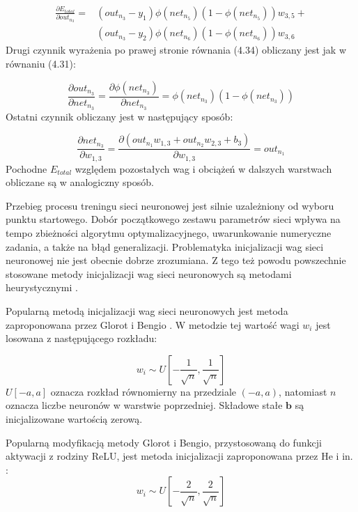 \documentclass[notitlepage]{report}
\begin{document}
\begin{equation}
\begin{split}
\frac{\partial E_{total}}{\partial out_{n_3}}  = & (out_{n_3} - y_1)\phi(net_{n_5})(1 - \phi(net_{n_5}))w_{3,5} + \\ & (out_{n_3} - y_2)\phi(net_{n_6})(1 - \phi(net_{n_6}))w_{3,6}
\end{split}
\end{equation}
Drugi czynnik wyrażenia po prawej stronie równania (4.34) obliczany jest jak w równaniu (4.31):

\begin{equation}
\frac{\partial out_{n_3}}{\partial net_{n_3}} = \frac{\partial \phi(net_{n_3})}{\partial net_{n_3}} = \phi (net_{n_3})(1 - \phi(net_{n_3}))
\end{equation}
Ostatni czynnik obliczany jest w następujący sposób:

\begin{equation}
\frac{\partial net_{n_3}}{\partial w_{1,3}} = \frac{\partial (out_{n_1}w_{1,3} + out_{n_2}w_{2,3} + b_3)}{\partial w_{1,3}} = out_{n_1}
\end{equation}
Pochodne $E_{total}$ względem pozostałych wag i obciążeń w dalszych warstwach obliczane są w analogiczny sposób.

Przebieg procesu treningu sieci neuronowej jest silnie uzależniony od wyboru punktu startowego. Dobór początkowego zestawu parametrów sieci wpływa na tempo zbieżności algorytmu optymalizacyjnego, uwarunkowanie numeryczne zadania, a także na błąd generalizacji. Problematyka inicjalizacji wag sieci neuronowej nie jest obecnie dobrze zrozumiana. Z tego też powodu powszechnie stosowane metody inicjalizacji wag sieci neuronowych są metodami heurystycznymi \cite{goodfellow}.

Popularną metodą inicjalizacji wag sieci neuronowych jest metoda zaproponowana przez Glorot i Bengio \cite{glorot2}. W metodzie tej wartość wagi $w_i$ jest losowana z następującego rozkładu:

\begin{equation}
w_i \sim U\left[ -\frac{1}{\sqrt{n}}, \frac{1}{\sqrt{n}}\right]
\end{equation}
$U[-a,a]$ oznacza rozkład równomierny na przedziale $(-a,a)$, natomiast $n$ oznacza liczbe neuronów w warstwie poprzedniej. Składowe stałe $\textbf{b}$ są inicjalizowane wartością zerową.

Popularną modyfikacją metody Glorot i Bengio, przystosowaną do funkcji aktywacji z rodziny ReLU, jest metoda inicjalizacji zaproponowana przez He i in. \cite{he}:
\begin{equation}
w_i \sim U\left[ -\frac{2}{\sqrt{n}}, \frac{2}{\sqrt{n}}\right]
\end{equation}
\end{document}
